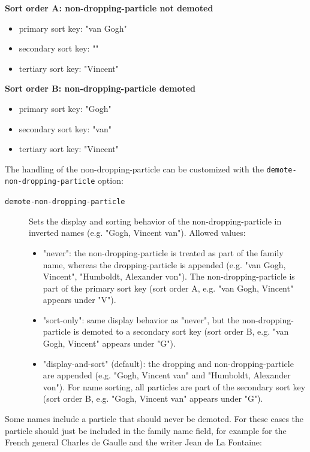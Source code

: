 \textbf{Sort order A: non-dropping-particle not demoted}

\begin{itemize}
\tightlist
\item
  primary sort key: "van Gogh"
\item
  secondary sort key: ""
\item
  tertiary sort key: "Vincent"
\end{itemize}

\textbf{Sort order B: non-dropping-particle demoted}

\begin{itemize}
\tightlist
\item
  primary sort key: "Gogh"
\item
  secondary sort key: "van"
\item
  tertiary sort key: "Vincent"
\end{itemize}

The handling of the non-dropping-particle can be customized with the
\texttt{demote-non-dropping-particle} option:

\begin{description}
\item[\texttt{demote-non-dropping-particle}]
Sets the display and sorting behavior of the non-dropping-particle in
inverted names (e.g. "Gogh, Vincent van"). Allowed values:

\begin{itemize}
\tightlist
\item
  "never": the non-dropping-particle is treated as part of the family
  name, whereas the dropping-particle is appended (e.g. "van Gogh,
  Vincent", "Humboldt, Alexander von"). The non-dropping-particle is
  part of the primary sort key (sort order A, e.g. "van Gogh, Vincent"
  appears under "V").
\item
  "sort-only": same display behavior as "never", but the
  non-dropping-particle is demoted to a secondary sort key (sort order
  B, e.g. "van Gogh, Vincent" appears under "G").
\item
  "display-and-sort" (default): the dropping and non-dropping-particle
  are appended (e.g. "Gogh, Vincent van" and "Humboldt, Alexander von").
  For name sorting, all particles are part of the secondary sort key
  (sort order B, e.g. "Gogh, Vincent van" appears under "G").
\end{itemize}
\end{description}

Some names include a particle that should never be demoted. For these
cases the particle should just be included in the family name field, for
example for the French general Charles de Gaulle and the writer Jean de
La Fontaine:

